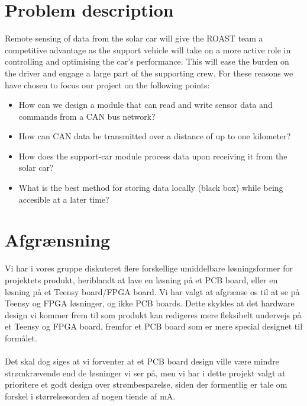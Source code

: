 \documentclass[]{article}
\begin{document}
\section{Problem description}
Remote sensing of data from the solar car will give the ROAST team a competitive advantage as the support vehicle will take on a more active role in controlling and optimising the car's performance. This will ease the burden on the driver and engage a large part of the supporting crew. For these reasons we have chosen to focus our project on the following points:   
\begin{itemize}
    \item How can we design a module that can read and write sensor data and commands from a CAN bus network? 
    \item How can CAN data be transmitted over a distance of up to one kilometer? 
    \item How does the support-car module process data upon receiving it from the solar car?
    \item What is the best method for storing data locally (black box) while being accesible at a later time? 
\end{itemize}

\section{Afgrænsning}
Vi har i vores gruppe diskuteret flere forskellige umiddelbare løsningsformer for projektets produkt, heriblandt at lave en løsning på et PCB board, eller en løsning på et Teensy board/FPGA board. Vi har valgt at afgrænse os til at se på Teensy og FPGA løsninger, og ikke PCB boards. Dette skyldes at det hardware design vi kommer frem til som produkt kan redigeres mere fleksibelt undervejs på et Teensy og FPGA board, fremfor et PCB board som er mere special designet til formålet.\\
\\
Det skal dog siges at vi forventer at et PCB board design ville være mindre strømkrævende end de løsninger vi ser på, men vi har i dette projekt valgt at prioritere et godt design over strømbesparelse, siden der formentlig er tale om forskel i størrelsesorden af nogen tiende af mA.
\end{document}
